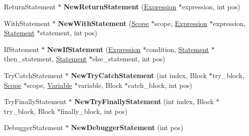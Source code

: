 \begin{DoxyCompactItemize}
\item 
\hypertarget{classv8_1_1internal_1_1_b_a_s_e___e_m_b_e_d_d_e_d_a441b97f9cf0e5c1990ef99f8ab41a306}{}Return\+Statement $\ast$ {\bfseries New\+Return\+Statement} (\hyperlink{classv8_1_1internal_1_1_expression}{Expression} $\ast$expression, int pos)\label{classv8_1_1internal_1_1_b_a_s_e___e_m_b_e_d_d_e_d_a441b97f9cf0e5c1990ef99f8ab41a306}

\item 
\hypertarget{classv8_1_1internal_1_1_b_a_s_e___e_m_b_e_d_d_e_d_a5e1f36bf312fe08b75c92e23bb684468}{}With\+Statement $\ast$ {\bfseries New\+With\+Statement} (\hyperlink{classv8_1_1internal_1_1_scope}{Scope} $\ast$scope, \hyperlink{classv8_1_1internal_1_1_expression}{Expression} $\ast$expression, \hyperlink{classv8_1_1internal_1_1_statement}{Statement} $\ast$statement, int pos)\label{classv8_1_1internal_1_1_b_a_s_e___e_m_b_e_d_d_e_d_a5e1f36bf312fe08b75c92e23bb684468}

\item 
\hypertarget{classv8_1_1internal_1_1_b_a_s_e___e_m_b_e_d_d_e_d_a6adc8166b1ef49f849aa1123f83e1431}{}If\+Statement $\ast$ {\bfseries New\+If\+Statement} (\hyperlink{classv8_1_1internal_1_1_expression}{Expression} $\ast$condition, \hyperlink{classv8_1_1internal_1_1_statement}{Statement} $\ast$then\+\_\+statement, \hyperlink{classv8_1_1internal_1_1_statement}{Statement} $\ast$else\+\_\+statement, int pos)\label{classv8_1_1internal_1_1_b_a_s_e___e_m_b_e_d_d_e_d_a6adc8166b1ef49f849aa1123f83e1431}

\item 
\hypertarget{classv8_1_1internal_1_1_b_a_s_e___e_m_b_e_d_d_e_d_a424380ee11c3af693db6619dcf192029}{}Try\+Catch\+Statement $\ast$ {\bfseries New\+Try\+Catch\+Statement} (int index, Block $\ast$try\+\_\+block, \hyperlink{classv8_1_1internal_1_1_scope}{Scope} $\ast$scope, \hyperlink{classv8_1_1internal_1_1_variable}{Variable} $\ast$variable, Block $\ast$catch\+\_\+block, int pos)\label{classv8_1_1internal_1_1_b_a_s_e___e_m_b_e_d_d_e_d_a424380ee11c3af693db6619dcf192029}

\item 
\hypertarget{classv8_1_1internal_1_1_b_a_s_e___e_m_b_e_d_d_e_d_ae87d539575030644f5daf65ae22aa448}{}Try\+Finally\+Statement $\ast$ {\bfseries New\+Try\+Finally\+Statement} (int index, Block $\ast$try\+\_\+block, Block $\ast$finally\+\_\+block, int pos)\label{classv8_1_1internal_1_1_b_a_s_e___e_m_b_e_d_d_e_d_ae87d539575030644f5daf65ae22aa448}

\item 
\hypertarget{classv8_1_1internal_1_1_b_a_s_e___e_m_b_e_d_d_e_d_af02025f491e4bfd120fffcfefbf4e080}{}Debugger\+Statement $\ast$ {\bfseries New\+Debugger\+Statement} (int pos)\label{classv8_1_1internal_1_1_b_a_s_e___e_m_b_e_d_d_e_d_af02025f491e4bfd120fffcfefbf4e080}


\end{DoxyCompactItemize}
